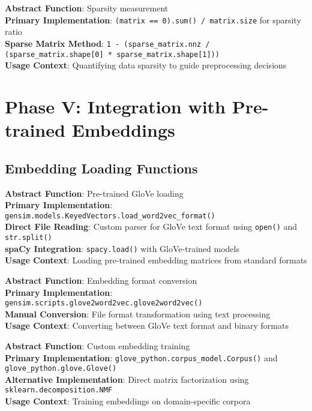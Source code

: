 \documentclass[11pt,a4paper]{article}
\begin{document}
\textbf{Abstract Function}: Sparsity measurement \\
\textbf{Primary Implementation}: \texttt{(matrix == 0).sum() / matrix.size} for sparsity ratio \\
\textbf{Sparse Matrix Method}: \texttt{1 - (sparse\_matrix.nnz / (sparse\_matrix.shape[0] * sparse\_matrix.shape[1]))} \\
\textbf{Usage Context}: Quantifying data sparsity to guide preprocessing decisions

\section{Phase V: Integration with Pre-trained Embeddings}

\subsection{Embedding Loading Functions}

\textbf{Abstract Function}: Pre-trained GloVe loading \\
\textbf{Primary Implementation}: \texttt{gensim.models.KeyedVectors.load\_word2vec\_format()} \\
\textbf{Direct File Reading}: Custom parser for GloVe text format using \texttt{open()} and \texttt{str.split()} \\
\textbf{spaCy Integration}: \texttt{spacy.load()} with GloVe-trained models \\
\textbf{Usage Context}: Loading pre-trained embedding matrices from standard formats

\textbf{Abstract Function}: Embedding format conversion \\
\textbf{Primary Implementation}: \texttt{gensim.scripts.glove2word2vec.glove2word2vec()} \\
\textbf{Manual Conversion}: File format transformation using text processing \\
\textbf{Usage Context}: Converting between GloVe text format and binary formats

\textbf{Abstract Function}: Custom embedding training \\
\textbf{Primary Implementation}: \texttt{glove\_python.corpus\_model.Corpus()} and \texttt{glove\_python.glove.Glove()} \\
\textbf{Alternative Implementation}: Direct matrix factorization using \texttt{sklearn.decomposition.NMF} \\
\textbf{Usage Context}: Training embeddings on domain-specific corpora
\end{document}
